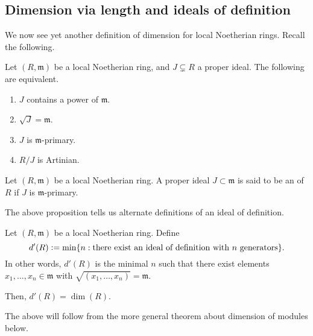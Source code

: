 \documentclass[12pt]{article}
\begin{document}
\subsection{Dimension via length and ideals of definition}

We now see yet another definition of dimension for local Noetherian rings. Recall the following.

\begin{prop}
	Let $(R, \mathfrak{m})$ be a local Noetherian ring, and $J \subsetneq R$ a proper ideal. The following are equivalent.
	\begin{enumerate}
		\item $J$ contains a power of $\mathfrak{m}$.
		\item $\sqrt{J} = \mathfrak{m}$.
		\item $J$ is $\mathfrak{m}$-primary.
		\item $R/J$ is Artinian.
	\end{enumerate}
\end{prop}

\begin{defn}
	Let $(R, \mathfrak{m})$ be a local Noetherian ring. A proper ideal $J \subset \mathfrak{m}$ is said to be an  of $R$ if $J$ is $\mathfrak{m}$-primary.
\end{defn}
The above proposition tells us alternate definitions of an ideal of definition.

\begin{prop}
	Let $(R, \mathfrak{m})$ be a local Noetherian ring. Define
	\begin{equation*} 
		d'(R) \vcentcolon= \min\{n : \text{there exist an ideal of definition with $n$ generators}\}.
	\end{equation*}
	In other words, $d'(R)$ is the minimal $n$ such that there exist elements $x_{1}, \ldots, x_{n} \in \mathfrak{m}$ with $\sqrt{(x_{1}, \ldots, x_{n})} = \mathfrak{m}$.

	Then, $d'(R) = \dim(R)$.
\end{prop}

The above will follow from the more general theorem about dimension of modules below.
\end{document}
